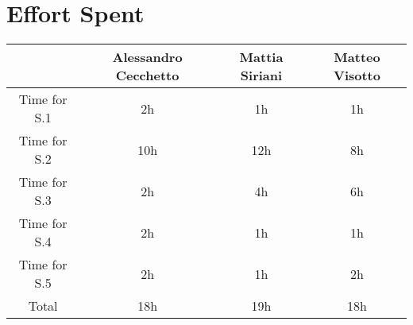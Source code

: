 \section{Effort Spent}
\begin{table}[h!]
    \centering
    \begin{tabular}{c||c|c|c}
     & Alessandro Cecchetto & Mattia Siriani & Matteo Visotto \\ \hline \hline
     
        Time for S.1 & 2h & 1h & 1h \\ \hline 
        Time for S.2 & 10h & 12h & 8h \\ \hline 
        Time for S.3 & 2h & 4h & 6h \\ \hline 
        Time for S.4 & 2h & 1h & 1h \\ \hline 
        Time for S.5 & 2h & 1h & 2h \\ \hline\hline
        Total & 18h & 19h & 18h \\ \hline
    \end{tabular}
\end{table}